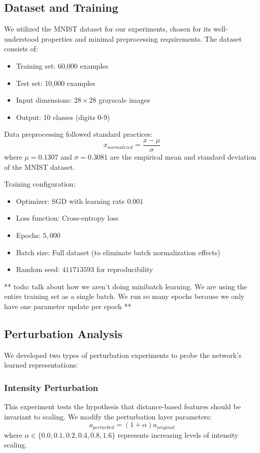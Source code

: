 \subsection{Dataset and Training}
We utilized the MNIST dataset for our experiments, chosen for its well-understood properties and minimal preprocessing requirements. The dataset consists of:
\begin{itemize}
    \item Training set: 60,000 examples
    \item Test set: 10,000 examples
    \item Input dimensions: $28 \times 28$ grayscale images
    \item Output: 10 classes (digits 0-9)
\end{itemize}

Data preprocessing followed standard practices:
\begin{equation}
    x_{normalized} = \frac{x - \mu}{\sigma}
\end{equation}
where $\mu = 0.1307$ and $\sigma = 0.3081$ are the empirical mean and standard deviation of the MNIST dataset.

Training configuration:
\begin{itemize}
    \item Optimizer: SGD with learning rate $0.001$
    \item Loss function: Cross-entropy loss
    \item Epochs: $5,000$
    \item Batch size: Full dataset (to eliminate batch normalization effects)
    \item Random seed: $411713593$ for reproducibility
\end{itemize}

** todo: talk about how we aren't doing minibatch learning. We are using the entire training set as a single batch. We run so many epochs because we only have one parameter update per epoch ** 

\subsection{Perturbation Analysis}

We developed two types of perturbation experiments to probe the network's learned representations:

\subsubsection{Intensity Perturbation}
This experiment tests the hypothesis that distance-based features should be invariant to scaling. We modify the perturbation layer parameters:
\begin{equation}
    a_{perturbed} = (1 + \alpha)a_{original}
\end{equation}
where $\alpha \in \{0.0, 0.1, 0.2, 0.4, 0.8, 1.6\}$ represents increasing levels of intensity scaling.

